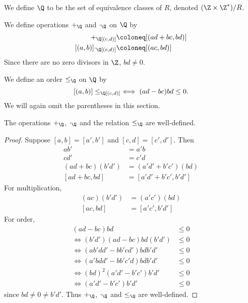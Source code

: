 \begin{definition*}
    We define $\Q$ to be the set of equivalence classes of $R$, denoted
    $(\Z \times \Z^*) / R$.
\end{definition*}
We define operations $+_\Q$ and $\cdot_\Q$ on $\Q$ by
\begin{align*}
    [(a, b)] +_\Q [(c, d)] &\coloneq [(ad + bc, bd)] \\
    [(a, b)] \cdot_\Q [(c, d)] &\coloneq [(ac, bd)]
\end{align*}
Since there are no zero divisors in $\Z$, $bd \neq 0$.

We define an order $\le_\Q$ on $\Q$ by \[
    [(a, b)] \le_\Q [(c, d)] \iff (ad - bc) bd \le 0.
\]
We will again omit the parentheses in this section.
\begin{proposition*} \label{thm:Q:well-defined}
    The operations $+_\Q$, $\cdot_\Q$ and the relation $\le_\Q$ are well-defined.
\end{proposition*}
\begin{proof}
    Suppose $[a, b] = [a', b']$ and $[c, d] = [c', d']$.
    Then \begin{align*}
        ab' &= a'b \\
        cd' &= c'd \\
        (ad + bc)(b'd') &= (a'd' + b'c')(bd) \\
        [ad + bc, bd] &= [a'd' + b'c', b'd']
    \end{align*}
    For multiplication, \begin{align*}
        (ac)(b'd') &= (a'c')(bd) \\
        [ac, bd] &= [a'c', b'd']
    \end{align*}
    For order, \begin{align*}
        (ad - bc) bd &\le 0 \\
        \iff (b'd')(ad - bc) bd (b'd') &\le 0 \\
        \iff (ab'dd' - bb'cd') bdb'd' &\le 0 \\
        \iff (a'bdd' - bb'c'd) bdb'd' &\le 0 \\
        \iff (bd)^2 (a'd' - b'c') b'd' &\le 0 \\
        \iff (a'd' - b'c') b'd' &\le 0
    \end{align*} since $bd \ne 0 \ne b'd'$.
    Thus $+_\Q$, $\cdot_\Q$ and $\le_\Q$ are well-defined.
\end{proof}
